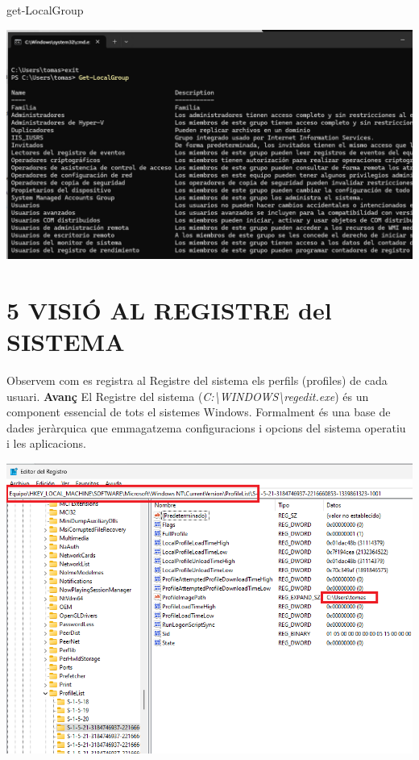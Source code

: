\documentclass[
  a4paper,
]{article}
\newenvironment{Shaded}{\begin{snugshade}}{\end{snugshade}}
\newcommand{\NormalTok}[1]{#1}
\begin{document}
\begin{Shaded}
\begin{Highlighting}[]
\NormalTok{get{-}LocalGroup}
\end{Highlighting}
\end{Shaded}

\includegraphics{png/get-LocalGroup.png}

\section{5 VISIÓ AL REGISTRE del
SISTEMA}\label{visiuxf3-al-registre-del-sistema}

Observem com es registra al Registre del sistema els perfils (profiles)
de cada usuari. \textbf{Avanç} El Registre del sistema
(\emph{C:\textbackslash WINDOWS\textbackslash regedit.exe}) és un
component essencial de tots el sistemes Windows. Formalment és una base
de dades jeràrquica que emmagatzema configuracions i opcions del sistema
operatiu i les aplicacions.

\includegraphics{png/regedit.png}
\end{document}
